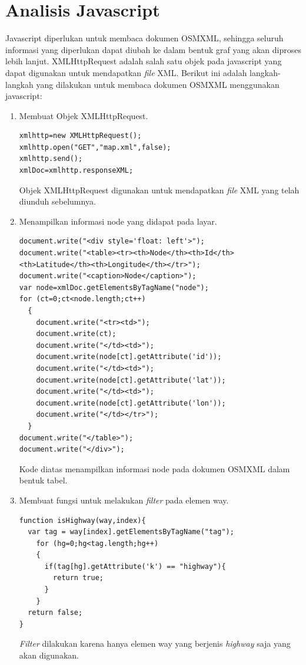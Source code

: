 \section{Analisis Javascript} \label{ssec:analisis_js}
Javascript diperlukan untuk membaca dokumen OSMXML, sehingga seluruh informasi
yang diperlukan dapat diubah ke dalam bentuk graf yang akan diproses lebih lanjut.
XMLHttpRequest adalah salah satu objek pada javascript yang dapat digunakan 
untuk mendapatkan \textit{file} XML. Berikut ini adalah langkah-langkah yang
dilakukan untuk membaca dokumen OSMXML menggunakan javascript:
\begin{enumerate}
  \item Membuat Objek XMLHttpRequest. 
\begin{verbatim}
xmlhttp=new XMLHttpRequest();
xmlhttp.open("GET","map.xml",false);
xmlhttp.send();
xmlDoc=xmlhttp.responseXML;
\end{verbatim}
Objek XMLHttpRequest digunakan untuk mendapatkan \textit{file} XML yang telah
diunduh sebelumnya.

  \item Menampilkan informasi node yang didapat pada layar.
\begin{verbatim}
document.write("<div style='float: left'>");
document.write("<table><tr><th>Node</th><th>Id</th>
<th>Latitude</th><th>Longitude</th></tr>");
document.write("<caption>Node</caption>");
var node=xmlDoc.getElementsByTagName("node");
for (ct=0;ct<node.length;ct++)
  {
    document.write("<tr><td>");
    document.write(ct);
    document.write("</td><td>");
    document.write(node[ct].getAttribute('id'));
    document.write("</td><td>");
    document.write(node[ct].getAttribute('lat'));
    document.write("</td><td>");
    document.write(node[ct].getAttribute('lon'));
    document.write("</td></tr>");
  }
document.write("</table>");
document.write("</div>");
\end{verbatim}
Kode diatas menampilkan informasi node pada dokumen OSMXML dalam bentuk tabel.

  \item Membuat fungsi untuk melakukan \textit{filter} pada elemen way.
\begin{verbatim}
function isHighway(way,index){
  var tag = way[index].getElementsByTagName("tag");
    for (hg=0;hg<tag.length;hg++)
    {
      if(tag[hg].getAttribute('k') == "highway"){
        return true;
      }
    }
  return false;
}
\end{verbatim}
\textit{Filter} dilakukan karena hanya elemen way yang berjenis \textit{highway}
saja yang akan digunakan.
	

\end{enumerate}
